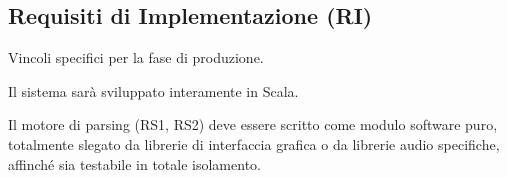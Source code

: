 \subsection{Requisiti di Implementazione (RI)}
Vincoli specifici per la fase di produzione.

\begin{description}[leftmargin=0.5cm, itemsep=0.8em]
    \item[RI1 (Tecnologia di Sviluppo):] Il sistema sarà sviluppato interamente in Scala.

    \item[RI2 (Isolamento del Dominio):] Il motore di parsing (RS1, RS2) deve essere scritto come modulo software puro, totalmente slegato da librerie di interfaccia grafica o da librerie audio specifiche, affinché sia testabile in totale isolamento.
\end{description}
